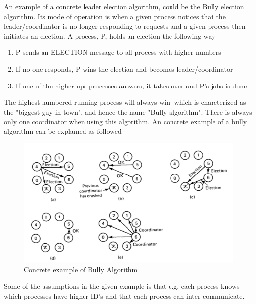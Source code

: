 \documentclass[Main]{subfiles}
\begin{document}
An example of a concrete leader election algorithm, could be the Bully election algorithm. Its mode of operation is when a given process notices that the leader/coordinator is no longer responding to requests and a given process then initiates an election. A process, P,  holds an election the following way
\begin{enumerate}
\item P sends an ELECTION message to all process with higher numbers
\item If no one responds, P wins the election and becomes leader/coordinator
\item If one of the higher ups processes answers, it takes over and P's jobs is done 
\end{enumerate}

The highest numbered running process will always win, which is charcterized as the "biggest guy in town", and hence the name "Bully algorithm".\cite{ElectionAlgorithm} There is always only one coordinator when using this algorithm. An concrete example of a bully algorithm can be explained as followed

\begin{figure}[hbtp]
\centering
\includegraphics[scale=0.8]{Figurer/BullyAlgorithm.png}
\caption{Concrete example of Bully Algorithm}
\end{figure}

Some of the assumptions in the given example is that e.g. each process knows which processes have higher ID's and that each process can inter-communicate. \cite{RMI-slides} 
\end{document}
